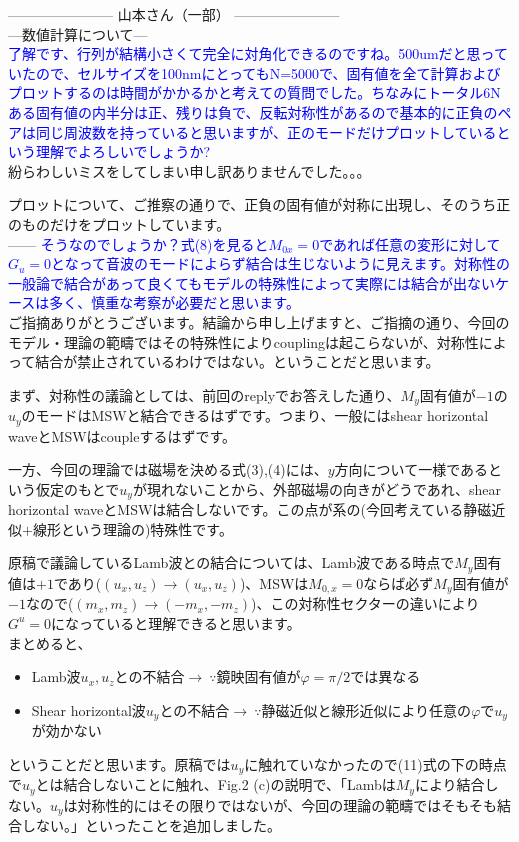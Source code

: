 \documentclass{jsarticle}
\begin{document}
-----------------------
山本さん（一部）
-----------------------\\

---数値計算について---\\
\textcolor{blue}{了解です、行列が結構小さくて完全に対角化できるのですね。500umだと思っていたので、セルサイズを100nmにとってもN=5000で、固有値を全て計算およびプロットするのは時間がかかるかと考えての質問でした。ちなみにトータル6Nある固有値の内半分は正、残りは負で、反転対称性があるので基本的に正負のペアは同じ周波数を持っていると思いますが、正のモードだけプロットしているという理解でよろしいでしょうか?}\\

紛らわしいミスをしてしまい申し訳ありませんでした。。。

プロットについて、ご推察の通りで、正負の固有値が対称に出現し、そのうち正のものだけをプロットしています。\\


------
\textcolor{blue}{そうなのでしょうか？式(8)を見ると$M_{0x}=0$であれば任意の変形に対して$G_u=0$となって音波のモードによらず結合は生じないように見えます。対称性の一般論で結合があって良くてもモデルの特殊性によって実際には結合が出ないケースは多く、慎重な考察が必要だと思います。}\\

ご指摘ありがとうございます。結論から申し上げますと、ご指摘の通り、今回のモデル・理論の範疇ではその特殊性によりcouplingは起こらないが、対称性によって結合が禁止されているわけではない。ということだと思います。

まず、対称性の議論としては、前回のreplyでお答えした通り、$M_y$固有値が$-1$の$u_y$のモードはMSWと結合できるはずです。つまり、一般にはshear horizontal waveとMSWはcoupleするはずです。

一方、今回の理論では磁場を決める式(3),(4)には、$y$方向について一様であるという仮定のもとで$u_y$が現れないことから、外部磁場の向きがどうであれ、shear horizontal waveとMSWは結合しないです。この点が系の(今回考えている静磁近似$+$線形という理論の)特殊性です。

原稿で議論しているLamb波との結合については、Lamb波である時点で$M_y$固有値は$+1$であり($(u_x,u_z)\to(u_x,u_z)$)、MSWは$M_{0,x}=0$ならば必ず$M_y$固有値が$-1$なので($(m_x,m_z)\to(-m_x,-m_z)$)、この対称性セクターの違いにより$G^u=0$になっていると理解できると思います。\\

まとめると、
\begin{itemize}
    \item Lamb波$u_x,u_z$との不結合$\to\ \because$鏡映固有値が$\varphi=\pi/2$では異なる
    \item Shear horizontal波$u_y$との不結合$\to\ \because$静磁近似と線形近似により任意の$\varphi$で$u_y$が効かない
\end{itemize}
ということだと思います。原稿では$u_y$に触れていなかったので(11)式の下の時点で$u_y$とは結合しないことに触れ、Fig.2 (c)の説明で、「Lambは$M_y$により結合しない。$u_y$は対称性的にはその限りではないが、今回の理論の範疇ではそもそも結合しない。」といったことを追加しました。\\
\end{document}
